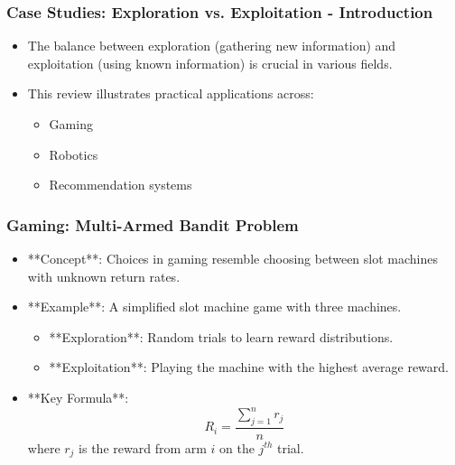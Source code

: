 \documentclass[aspectratio=169]{beamer}
\begin{document}
\begin{frame}[fragile]
    \frametitle{Case Studies: Exploration vs. Exploitation - Introduction}
    \begin{itemize}
        \item The balance between exploration (gathering new information) and exploitation (using known information) is crucial in various fields.
        \item This review illustrates practical applications across:
        \begin{itemize}
            \item Gaming
            \item Robotics
            \item Recommendation systems
        \end{itemize}
    \end{itemize}
\end{frame}

\begin{frame}[fragile]
    \frametitle{Gaming: Multi-Armed Bandit Problem}
    \begin{itemize}
        \item **Concept**: Choices in gaming resemble choosing between slot machines with unknown return rates.
        \item **Example**: A simplified slot machine game with three machines.
        \begin{itemize}
            \item **Exploration**: Random trials to learn reward distributions.
            \item **Exploitation**: Playing the machine with the highest average reward.
        \end{itemize}
        \item **Key Formula**: 
        \begin{equation}
        R_i = \frac{\sum_{j=1}^{n} r_j}{n}
        \end{equation}
        where \( r_j \) is the reward from arm \( i \) on the \( j^{th} \) trial.
    \end{itemize}
\end{frame}
\end{document}
